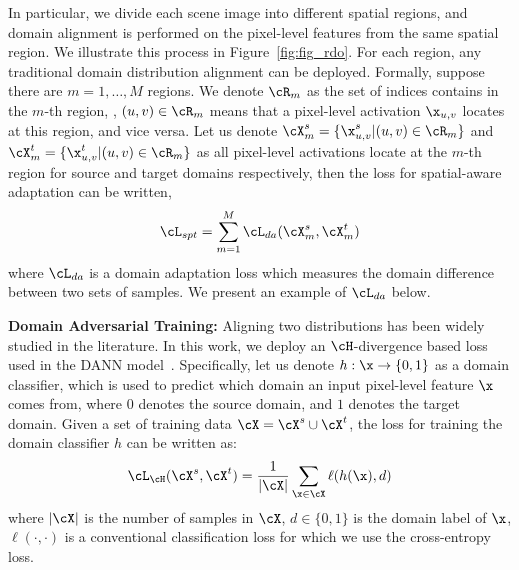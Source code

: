 \documentclass[10pt,twocolumn,letterpaper]{article}
\begin{document}
In particular, we divide each scene image into different spatial regions, and domain alignment is performed on the pixel-level features from the same spatial region. We illustrate this process in Figure~\ref{fig:fig_rdo}. For each region, any traditional domain distribution alignment can be deployed. Formally, suppose there are $m = 1, \ldots, M$ regions. We denote $\cR_m$ as the set of indices contains in the $m$-th region, \ie, $(u,v) \in \cR_m$ means that a pixel-level activation $\x_{u,v}$ locates at this region, and vice versa. Let us denote $\cX^s_m = \{\x^s_{u,v} | (u,v) \in \cR_m\}$ and $\cX^t_m = \{\x^t_{u,v} | (u,v) \in \cR_m\}$ as all pixel-level activations locate at the $m$-th region for source and target domains respectively, then the loss for spatial-aware adaptation can be written,
\begin{eqnarray}
\label{eqn:loss_rdo}
\cL_{spt} = \sum_{m=1}^M \cL_{da}(\cX^s_m, \cX^t_m)
\end{eqnarray}
where $\cL_{da}$ is a domain adaptation loss which measures the domain difference between two sets of samples. We present an example of $\cL_{da}$ below.

\textbf{Domain Adversarial Training: } Aligning two distributions has been widely studied in the literature. In this work, we deploy an $\cH$-divergence based loss used in the DANN model~\cite{ganin2015unsupervised}. Specifically, let us denote $h : \x\rightarrow\{0,1\}$ as a domain classifier, which is used to predict which domain an input pixel-level feature $\x$ comes from, where $0$ denotes the source domain, and $1$ denotes the target domain. Given a set of training data $\cX = \cX^s \cup \cX^t$, the loss for training the domain classifier $h$ can be written as:
\begin{eqnarray}
\label{eqn:loss_dc}
\cL_{\cH}(\cX^s, \cX^t) = \frac{1}{|\cX|}\sum_{\x \in \cX}\ell(h(\x), d)
\end{eqnarray}
where $|\cX|$ is the number of samples in $\cX$, $d \in \{0, 1\}$ is the domain label of $\x$, $\ell(\cdot,\cdot)$ is a conventional classification loss for which we use the cross-entropy loss. 
\end{document}
